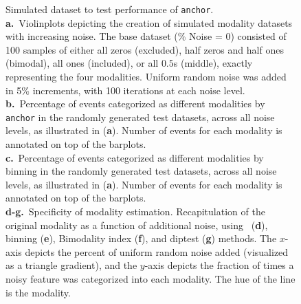 \clearpage
\thispagestyle{facingcaption}
\begin{figure}[h]
\captionsetup{labelformat=prev-page}
\caption[Simulated ``Perfect Modality'' dataset to test performance of \texttt{anchor}.]{
Simulated dataset to test performance of \texttt{anchor}.\\
\textbf{a.}~Violinplots depicting the creation of simulated modality datasets with increasing noise. The base dataset (\% Noise = 0) consisted of 100 samples of either all zeros (excluded), half zeros and half ones (bimodal), all ones (included), or all $0.5$s (middle), exactly representing the four modalities. Uniform random noise was added in 5\% increments, with 100 iterations at each noise level.
\textbf{b.}~Percentage of events categorized as different modalities by \texttt{anchor} in the randomly generated test datasets, across all noise levels, as illustrated in (\textbf{a}). Number of events for each modality is annotated on top of the barplots. \\
\textbf{c.}~Percentage of events categorized as different modalities by binning in the randomly generated test datasets, across all noise levels, as illustrated in (\textbf{a}). Number of events for each modality is annotated on top of the barplots. \\
\textbf{d-g.}~Specificity of modality estimation. Recapitulation of the original modality as a function of additional noise, using \anchor\, (\textbf{d}), binning (\textbf{e}), Bimodality index (\textbf{f}), and diptest (\textbf{g}) methods. The $x$-axis depicts the percent of uniform random noise added (visualized as a triangle gradient), and the $y$-axis depicts the fraction of times a noisy feature was categorized into each modality. The hue of the line is the modality.
}
\label{fig:anchor_simulations_perfect_modalities}
\end{figure}
\clearpage
